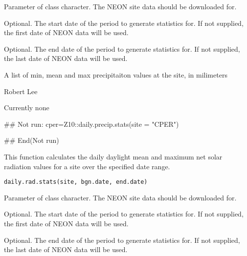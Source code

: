 \documentclass[a4paper]{book}
\begin{document}
%
\begin{Arguments}
\begin{ldescription}
\item[\code{site}] Parameter of class character.
The NEON site data should be downloaded for.

\item[\code{bgn.date}] Optional. The start date of the period to generate statistics for.
If not supplied, the first date of NEON data will be used.

\item[\code{end.date}] Optional. The end date of the period to generate statistics for.
If not supplied, the last date of NEON data will be used.
\end{ldescription}
\end{Arguments}
%
\begin{Value}
A list of min, mean and max precipitaiton
values at the site, in milimeters
\end{Value}
%
\begin{Author}\relax
Robert Lee \\{}
\end{Author}
%
\begin{SeeAlso}\relax
Currently none
\end{SeeAlso}
%
\begin{Examples}
\begin{ExampleCode}
## Not run: 
cper=Z10::daily.precip.stats(site = "CPER")

## End(Not run)
\end{ExampleCode}
\end{Examples}
%
\begin{Description}\relax
This function calculates the daily daylight mean and maximum
net solar radiation values for a site over the specified date range.
\end{Description}
%
\begin{Usage}
\begin{verbatim}
daily.rad.stats(site, bgn.date, end.date)
\end{verbatim}
\end{Usage}
%
\begin{Arguments}
\begin{ldescription}
\item[\code{site}] Parameter of class character.
The NEON site data should be downloaded for.

\item[\code{bgn.date}] Optional. The start date of the period to generate statistics for.
If not supplied, the first date of NEON data will be used.

\item[\code{end.date}] Optional. The end date of the period to generate statistics for.
If not supplied, the last date of NEON data will be used.
\end{ldescription}
\end{Arguments}
\end{document}
